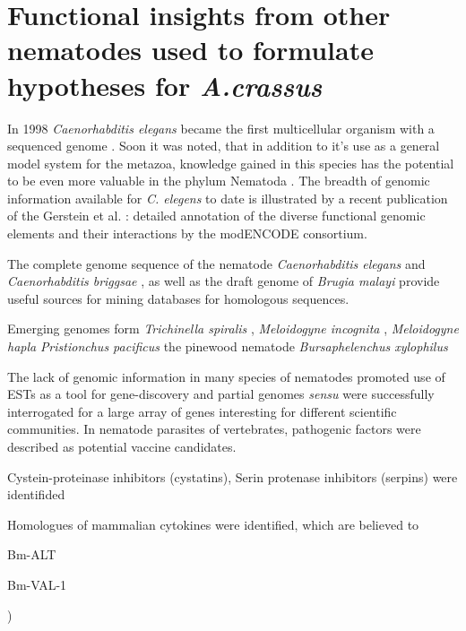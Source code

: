 \section{Functional insights from other nematodes used to formulate
  hypotheses for \textit{A.crassus}}
\label{func-ins}

In 1998 \textit{Caenorhabditis elegans} became the first multicellular
organism with a sequenced genome \cite{pmid9851916}. Soon it was
noted, that in addition to it's use as a general model system for the
metazoa, knowledge gained in this species has the potential to be even
more valuable in the phylum Nematoda
\cite{blaxter_caenorhabditis_1998}. The breadth of genomic information
available for \textit{C. elegens} to date is illustrated by a recent
publication of the Gerstein et al. \cite{pmid21177976}: detailed
annotation of the diverse functional genomic elements and their
interactions by the modENCODE consortium.

The complete genome sequence of the nematode \textit{Caenorhabditis
  elegans} \cite{pmid9851916} and \textit{Caenorhabditis briggsae}
\cite{stein_genome_2003}, as well as the draft genome of
\textit{Brugia malayi} \cite{ghedin_draft_2007} provide useful sources
for mining databases for homologous sequences.

Emerging genomes form \textit{Trichinella spiralis}
\cite{pmid21336279}, \textit{Meloidogyne incognita}
\cite{pmid18660804}, \textit{Meloidogyne hapla} \cite{pmid18809916}
\textit{Pristionchus pacificus} the pinewood nematode
\textit{Bursaphelenchus xylophilus} \cite{pmid21909270} 

The lack of genomic information in many species of nematodes promoted
use of ESTs as a tool for gene-discovery and partial genomes
\textit{sensu} \cite{parkinson_partigene--constructing_2004} were
successfully interrogated for a large array of genes interesting for
different scientific communities. In nematode parasites of
vertebrates, pathogenic factors were described as potential vaccine
candidates.

Cystein-proteinase inhibitors (cystatins), Serin protenase inhibitors
(serpins) were identifided 


Homologues of mammalian cytokines were identified, which are believed
to



Bm-ALT

Bm-VAL-1

\cite{ blaxter_genes_1996,
  daub_survey_2000, parkinson_transcriptomic_2004, mitreva_gene_2004})


